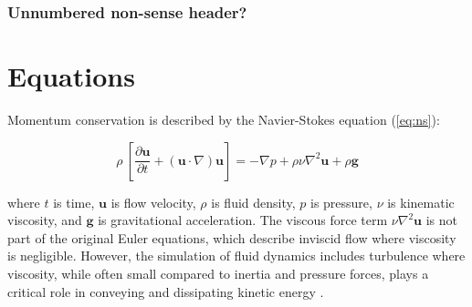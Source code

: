\subsubsection*{Unnumbered non-sense header?}

   	
\section{Equations}

Momentum conservation is described by the Navier-Stokes equation  (\autoref{eq:ns}):

\begin{equation} \label{eq:ns}
	\rho~\left[\frac{\partial \mathbf{u}}{\partial t} + \left(\mathbf{u} \cdot \nabla\right) \mathbf{u}\right] = -\nabla p + \rho \nu \nabla^2\mathbf{u} + \rho \mathbf{g} 
\end{equation}

where $t$ is time, $\mathbf{u}$ is flow velocity, $\rho$ is fluid density, $p$ is pressure, $\nu$ is kinematic viscosity, and $\mathbf{g}$ is gravitational acceleration. The viscous force term $\nu \nabla^2 \mathbf{u}$ is not part of the original Euler equations, which describe inviscid flow where viscosity is negligible. However, the simulation of fluid dynamics includes turbulence where viscosity, while often small compared to inertia and pressure forces, plays a critical role in conveying and dissipating kinetic energy \cite{macdonald2007metallurgical,kundu2008fluid}. 
    
